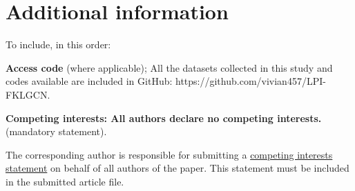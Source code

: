 \documentclass[fleqn,10pt]{wlscirep}
\begin{document}
\section*{Additional information}
To include, in this order: 

\textbf{Access code} (where applicable); 
All the datasets collected in this study and codes available are included in GitHub: https://github.com/vivian457/LPI-FKLGCN.

\textbf{Competing interests: All authors declare no competing interests.} (mandatory statement). 

The corresponding author is responsible for submitting a \href{http://www.nature.com/srep/policies/index.html#competing}{competing interests statement} on behalf of all authors of the paper. This statement must be included in the submitted article file.
\end{document}
